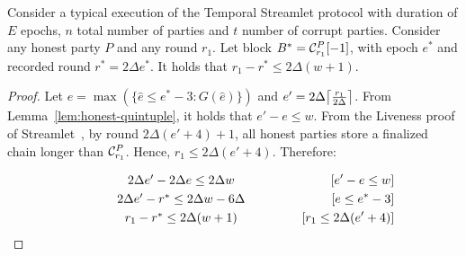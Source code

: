 \begin{lemma} \label{lem:latest-finalized-round}
  Consider a typical execution of the Temporal Streamlet protocol with duration
  of $E$ epochs, $n$ total number of parties and $t$ number of corrupt parties.
  Consider any honest party $P$ and any round $r_1$. Let block
  $B^* = \mathcal{C}^P_{r_1}[-1]$, with
  epoch $e^*$ and recorded round $r^* = 2\Delta e^*$.
  It holds that $r_1 - r^* \leq 2\Delta(w + 1)$.
\end{lemma}
\begin{proof}
  Let $e = \max(\{\hat e \leq e^* - 3: G(\hat e)\})$ and $e' = 2\Delta \ceil*{\frac{r_1}{2\Delta}}$.
  From Lemma~\ref{lem:honest-quintuple}, it holds that $e' - e \leq w$.
  From the Liveness proof of Streamlet~\cite{streamlet}, by round $2\Delta (e' + 4) + 1$,
  all honest parties store a finalized chain longer than $\mathcal{C}^P_{r_1}$.
  Hence, $r_1 \leq 2\Delta (e' + 4)$.
  Therefore:

  \begin{align*}
    \makebox[0.5\textwidth][c]{$2\Delta e' - 2\Delta e \leq 2\Delta w$}           && \text{[$e' - e \leq w$]}\\
    \makebox[0.5\textwidth][c]{$2\Delta e' - r^* \leq 2\Delta w - 6\Delta$}       && \text{[$e \leq e^* - 3$]} \\
    \makebox[0.5\textwidth][c]{$r_1 - r^* \leq 2\Delta(w + 1)$}                  && \text{[$r_1 \leq 2\Delta (e' + 4)$]}
  \end{align*}
  \Qed
\end{proof}


